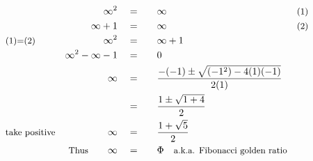 \begin{alignat*}{5}
&\,&\infty^2\quad&=\quad&&\infty\qquad&\small\text{(1)}\\
&\,&\infty+1\quad&=&&\infty&\small\text{(2)}\\
&\small\text{(1)=(2)}\normalsize\quad&\infty^2\quad&=&&\infty+1\\
&\,&\infty^2-\infty-1\quad&=&&0\\
&\,&\infty\quad&=&&\frac{-(-1)\pm\sqrt{(-1^2)-4(1)(-1)}}{2(1)}\\
&\,&\,&=&&\frac{1\pm\sqrt{1+4}}{2}\\
&\small\text{take positive}&\infty\quad&=&&\frac{1+\sqrt{5}}{2}\\
&\,&\small\text{Thus}\normalsize\qquad\infty\quad&=&&\Phi\quad\small\text{a.k.a. Fibonacci golden ratio}
\end{alignat*}
